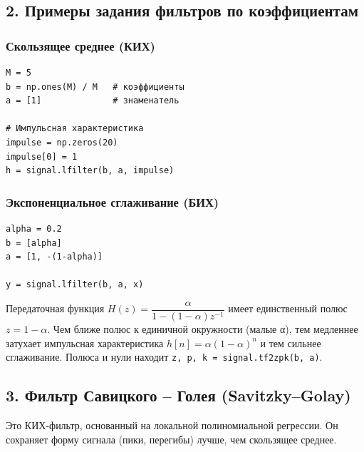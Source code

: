 \documentclass[12pt,a4paper,openany]{book}
\begin{document}
\subsection*{2. Примеры задания фильтров по коэффициентам}

\subsubsection*{Скользящее среднее (КИХ)}

\begin{Verbatim}[fontsize=\small, breaklines, breakanywhere]
M = 5
b = np.ones(M) / M   # коэффициенты
a = [1]              # знаменатель

# Импульсная характеристика
impulse = np.zeros(20)
impulse[0] = 1
h = signal.lfilter(b, a, impulse)
\end{Verbatim}

\subsubsection*{Экспоненциальное сглаживание (БИХ)}

\begin{Verbatim}[fontsize=\small, breaklines, breakanywhere]
alpha = 0.2
b = [alpha]
a = [1, -(1-alpha)]

y = signal.lfilter(b, a, x)
\end{Verbatim}

Передаточная функция \(H(z) = \dfrac{\alpha}{1 - (1-\alpha)z^{-1}}\) имеет единственный полюс \(z = 1 - \alpha\). Чем ближе полюс к единичной окружности (малые α), тем медленнее затухает импульсная характеристика \(h[n] = \alpha(1-\alpha)^n\) и тем сильнее сглаживание. Полюса и нули находит \texttt{z,\allowbreak{}\ p,\allowbreak{}\ k\ =\allowbreak{}\ signal.\allowbreak{}tf2zpk(\allowbreak{}b,\allowbreak{}\ a)}.

\subsection*{3. Фильтр Савицкого -- Голея (Savitzky--Golay)}

Это КИХ-фильтр, основанный на локальной полиномиальной регрессии. Он сохраняет форму сигнала (пики, перегибы) лучше, чем скользящее среднее.
\end{document}
